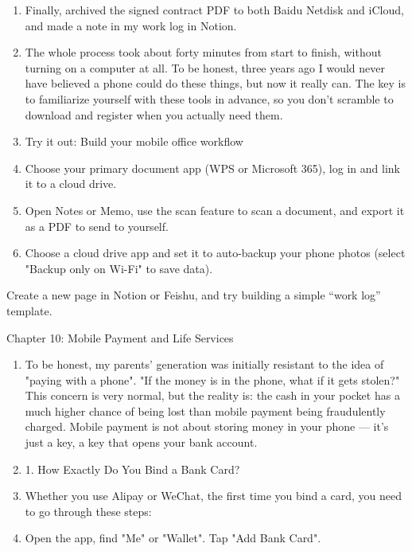 \begin{enumerate}
  \item Finally, archived the signed contract PDF to both Baidu Netdisk and iCloud, and made a note in my work log in Notion.
  \item The whole process took about forty minutes from start to finish, without turning on a computer at all. To be honest, three years ago I would never have believed a phone could do these things, but now it really can. The key is to familiarize yourself with these tools in advance, so you don't scramble to download and register when you actually need them.
  \item Try it out: Build your mobile office workflow
  \item Choose your primary document app (WPS or Microsoft 365), log in and link it to a cloud drive.
  \item Open Notes or Memo, use the scan feature to scan a document, and export it as a PDF to send to yourself.
  \item Choose a cloud drive app and set it to auto-backup your phone photos (select "Backup only on Wi-Fi" to save data).
\end{enumerate}

Create a new page in Notion or Feishu, and try building a simple “work log” template.

\begin{tcbpractice}{Chapter 10: Mobile Payment and Life Services}
\begin{enumerate}
  \item To be honest, my parents' generation was initially resistant to the idea of "paying with a phone". "If the money is in the phone, what if it gets stolen?" This concern is very normal, but the reality is: the cash in your pocket has a much higher chance of being lost than mobile payment being fraudulently charged. Mobile payment is not about storing money in your phone — it's just a key, a key that opens your bank account.
  \item 1. How Exactly Do You Bind a Bank Card?
  \item Whether you use Alipay or WeChat, the first time you bind a card, you need to go through these steps:
  \item Open the app, find "Me" or "Wallet". Tap "Add Bank Card".
\end{enumerate}

\end{tcbpractice}
